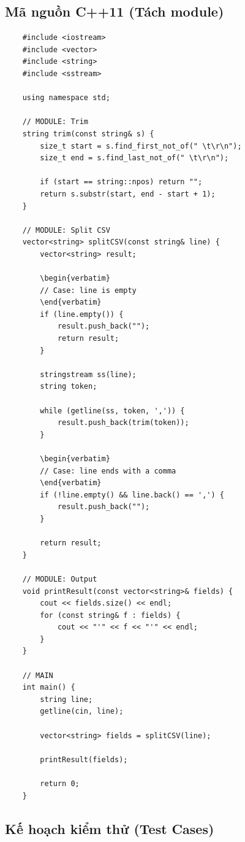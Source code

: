 \subsection{Mã nguồn C++11 (Tách module)}
    \begin{lstlisting}
    #include <iostream>
    #include <vector>
    #include <string>
    #include <sstream>

    using namespace std;

    // MODULE: Trim
    string trim(const string& s) {
        size_t start = s.find_first_not_of(" \t\r\n");
        size_t end = s.find_last_not_of(" \t\r\n");

        if (start == string::npos) return "";
        return s.substr(start, end - start + 1);
    }

    // MODULE: Split CSV
    vector<string> splitCSV(const string& line) {
        vector<string> result;

        \begin{verbatim}
        // Case: line is empty
        \end{verbatim}
        if (line.empty()) {
            result.push_back("");
            return result;
        }

        stringstream ss(line);
        string token;

        while (getline(ss, token, ',')) {
            result.push_back(trim(token));
        }

        \begin{verbatim}
        // Case: line ends with a comma
        \end{verbatim}
        if (!line.empty() && line.back() == ',') {
            result.push_back("");
        }

        return result;
    }

    // MODULE: Output
    void printResult(const vector<string>& fields) {
        cout << fields.size() << endl;
        for (const string& f : fields) {
            cout << "'" << f << "'" << endl;
        }
    }

    // MAIN
    int main() {
        string line;
        getline(cin, line);

        vector<string> fields = splitCSV(line);

        printResult(fields);

        return 0;
    }\end{lstlisting}

\subsection{Kế hoạch kiểm thử (Test Cases)}

